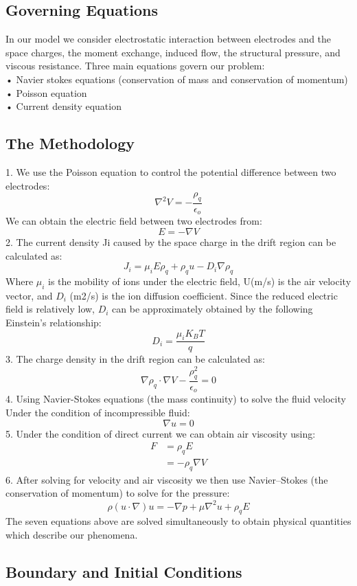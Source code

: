 \subsection*{Governing Equations}
In our model we consider electrostatic interaction between electrodes and the space charges, the moment exchange, induced flow, the structural pressure, and viscous resistance.  
Three main equations govern our problem:\\
•	Navier stokes equations (conservation of mass and conservation of momentum)\\
•	Poisson equation\\
•	Current density equation\\
\subsection*{The Methodology}
1.	We use the Poisson equation to control the potential difference between two electrodes:
$$\nabla^2 V = - \frac{\rho_q }{\epsilon_o}$$
We can obtain the electric field between two electrodes from:
$$E = - \nabla V $$
2.	The current density Ji caused by the space charge in the drift region can be calculated as:
$$J_i = \mu_i E \rho_q + \rho_q u - D_i \nabla \rho_q$$
Where $\mu_i$ is the mobility of ions under the electric field, U(m/s) is the air velocity vector, and  
$D_i$ (m2/s) is the ion diffusion coefficient.
Since the reduced electric field is   relatively low,   $D_i$ can be approximately obtained by  
the following Einstein’s relationship:
$$D_i = \frac{\mu_i K_B T}{q}$$
3.	The charge density in the drift region can be calculated as:
$$\nabla \rho_q \cdot \nabla V - \frac{\rho_q^2}{\epsilon_o}=0$$
4.	Using Navier-Stokes equations (the mass continuity) to solve the fluid velocity
Under the condition of incompressible fluid:
$$\nabla u =0 $$
5.	Under the condition of direct current we can obtain air viscosity using:
\begin{align*}
F&= \rho_q E \\
&= -\rho_q\nabla V\end{align*}
6.	After solving for velocity and air viscosity we then use Navier–Stokes (the conservation of momentum) to solve for the pressure:
$$\rho(u\cdot \nabla)u= - \nabla p + \mu \nabla^2 u + \rho_q E$$
 The seven equations above are solved simultaneously to obtain physical quantities which describe our phenomena.\cite{Elsalakawy}
\subsection*{Boundary and Initial Conditions}
